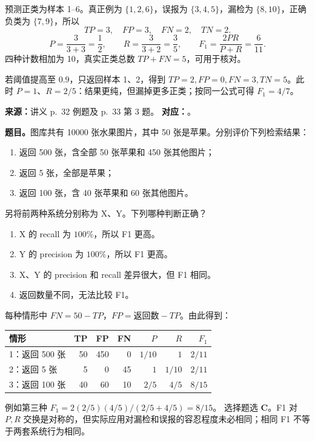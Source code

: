 \begin{checkedsolution}
预测正类为样本 1--6。真正例为 $\{1,2,6\}$，误报为 $\{3,4,5\}$，漏检为 $\{8,10\}$，正确负类为 $\{7,9\}$，所以
\[
  TP=3,\quad FP=3,\quad FN=2,\quad TN=2.
\]
\[
  P=\frac3{3+3}=\boxed{\frac12},\qquad
  R=\frac3{3+2}=\boxed{\frac35},\qquad
  F_1=\frac{2PR}{P+R}=\boxed{\frac6{11}}.
\]
四种计数相加为 10，真实正类总数 $TP+FN=5$，可用于核对。

若阈值提高至 $0.9$，只返回样本 1、2，得到
$TP=2,FP=0,FN=3,TN=5$。此时 $P=1$、$R=2/5$：结果更纯，但漏掉更多正类；按同一公式可得 $F_1=4/7$。
\end{checkedsolution}

\nopagebreak[4]

\textbf{来源：}讲义 p.~32 例题及 p.~33 第 3 题。
\textbf{对应：}。

\textbf{题目。}图库共有 10000 张水果图片，其中 50 张是苹果。分别评价下列检索结果：
\begin{enumerate}[nosep]
  \item 返回 500 张，含全部 50 张苹果和 450 张其他图片；
  \item 返回 5 张，全部是苹果；
  \item 返回 100 张，含 40 张苹果和 60 张其他图片。
\end{enumerate}
另将前两种系统分别称为 X、Y。下列哪种判断正确？
\begin{enumerate}[label=\Alph*.,nosep]
  \item X 的 recall 为 $100\%$，所以 F1 更高。
  \item Y 的 precision 为 $100\%$，所以 F1 更高。
  \item X、Y 的 precision 和 recall 差异很大，但 F1 相同。
  \item 返回数量不同，无法比较 F1。
\end{enumerate}

\begin{checkedsolution}
每种情形中 $FN=50-TP$，$FP=\text{返回数}-TP$。由此得到：
\begin{center}
\begin{tabular}{@{}lrrrrrr@{}}
  \toprule
  情形 & TP & FP & FN & $P$ & $R$ & $F_1$ \\
  \midrule
  1：返回 500 张 & 50 & 450 & 0 & $1/10$ & $1$ & $2/11$ \\
  2：返回 5 张 & 5 & 0 & 45 & $1$ & $1/10$ & $2/11$ \\
  3：返回 100 张 & 40 & 60 & 10 & $2/5$ & $4/5$ & $8/15$ \\
  \bottomrule
\end{tabular}
\end{center}
例如第三种 $F_1=2(2/5)(4/5)/(2/5+4/5)=8/15$。
选择题选 \textbf{C}。F1 对 $P,R$ 交换是对称的，但实际应用对漏检和误报的容忍程度未必相同；相同 F1 不等于两套系统行为相同。
\end{checkedsolution}

